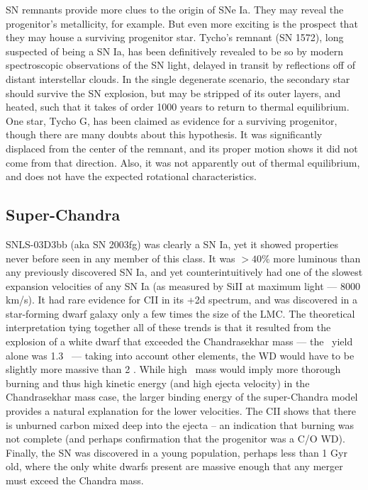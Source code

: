 \documentclass{nature1}
\begin{document}
SN remnants provide more clues to the origin of SNe Ia.  They may
reveal the progenitor's metallicity\citep{2008ApJ...680.1149B}, for
example.  But even more exciting is the prospect that they may house a
surviving progenitor star.  Tycho's remnant (SN 1572), long suspected
of being a SN Ia, has been definitively revealed to be so by modern
spectroscopic observations of the SN light, delayed in transit by
reflections off of distant interstellar
clouds\citep{2008Natur.456..617K}.  In the single degenerate scenario,
the secondary star should survive the SN explosion, but may be
stripped of its outer layers, and heated, such that it takes of order
1000 years to return to thermal equilibrium\citep{2000ApJS..128..615M}.
One star, Tycho G, has been claimed as evidence for a surviving
progenitor\citep{2004Natur.431.1069R,2009ApJ...691....1G}, though
there are many doubts about this hypothesis.  It was significantly
displaced from the center of the remnant, and its proper motion shows
it did not come from that direction.  Also, it was not apparently out
of thermal equilibrium, and does not have the expected rotational
characteristics\citep{2009ApJ...701.1665K}.

\subsection{Super-Chandra}
SNLS-03D3bb (aka SN 2003fg) was clearly a SN Ia, yet it showed
properties never before seen in any member of this class.  It was
$>40\%$ more luminous than any previously discovered SN Ia, and yet
counterintuitively had one of the slowest expansion velocities of any
SN Ia (as measured by SiII at maximum light --- 8000 km/s).  It had
rare evidence for CII in its +2d spectrum, and was discovered in a
star-forming dwarf galaxy only a few times the size of the
LMC\citep{2006Natur.443..308H}.  The theoretical interpretation tying
together all of these trends is that it resulted from the explosion of
a white dwarf that exceeded the Chandrasekhar mass --- the \Ni\ yield
alone was 1.3 \Msun\ --- taking into account other elements, the WD
would have to be slightly more massive than 2 \Msun .  While high \Ni\
mass would imply more thorough burning and thus high kinetic energy
(and high ejecta velocity) in the Chandrasekhar mass case, the larger
binding energy of the super-Chandra model provides a natural
explanation for the lower velocities.  The CII shows that there is
unburned carbon mixed deep into the ejecta -- an indication that
burning was not complete (and perhaps confirmation that the progenitor
was a C/O WD).  Finally, the SN was discovered in a young population,
perhaps less than 1 Gyr old, where the only white dwarfs present are
massive enough that any merger must exceed the Chandra mass.
\end{document}
